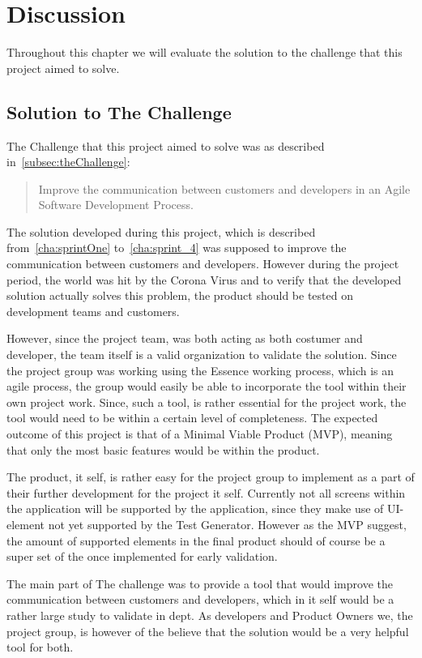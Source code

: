 \section{Discussion}

Throughout this chapter we will evaluate the solution to the challenge that this project aimed to solve.

\subsection{Solution to The Challenge}

The Challenge that this project aimed to solve was as described in~\autoref{subsec:theChallenge}:

\begin{quote}
    Improve the communication between customers and developers in an Agile Software Development Process.
\end{quote}

The solution developed during this project, which is described from~\autoref{cha:sprintOne} to~\autoref{cha:sprint_4} was supposed to improve the communication between customers and developers.
However during the project period, the world was hit by the Corona Virus and to verify that the developed solution actually solves this problem, the product should be tested on development teams and customers.

However, since the project team, was both acting as both costumer and developer, the team itself is a valid organization to validate the solution.
Since the project group was working using the Essence working process, which is an agile process, the group would easily be able to incorporate the tool within their own project work.
Since, such a tool, is rather essential for the project work, the tool would need to be within a certain level of completeness.
The expected outcome of this project is that of a Minimal Viable Product (MVP), meaning that only the most basic features would be within the product.

The product, it self, is rather easy for the project group to implement as a part of their further development for the project it self.
Currently not all screens within the application will be supported by the application, since they make use of UI-element not yet supported by the Test Generator.
However as the MVP suggest, the amount of supported elements in the final product should of course be a super set of the once implemented for early validation.

The main part of The challenge was to provide a tool that would improve the communication between customers and developers, which in it self would be a rather large study to validate in dept.
As developers and Product Owners we, the project group, is however of the believe that the solution would be a very helpful tool for both.